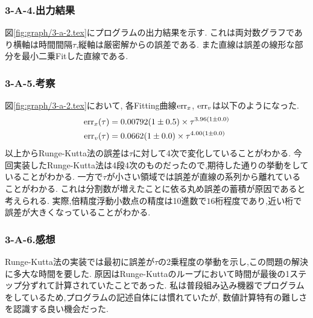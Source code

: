 \subsubsection*{3-A-4.出力結果}
図\ref{fig:graph/3-a-2.tex}にプログラムの出力結果を示す.
これは両対数グラフであり横軸は時間間隔$\tau$,縦軸は厳密解からの誤差である.
また直線は誤差の線形な部分を最小二乗Fitした直線である.
\subsubsection*{3-A-5.考察}
図\ref{fig:graph/3-a-2.tex}において,
各Fitting曲線${\rm err}_x$, ${\rm err}_v$は以下のようになった.
\begin{align}
  {\rm err}_x(\tau)&=0.00792(1\pm0.5)\times \tau^{3.96(1\pm0.0)}\\
  {\rm err}_v(\tau)&=0.0662(1\pm0.0)\times \tau^{4.00(1\pm0.0)}
\end{align}
以上からRunge-Kutta法の誤差は$\tau$に対して4次で変化していることがわかる.
今回実装したRunge-Kutta法は4段4次のものだったので,期待した通りの挙動をしていることがわかる.
一方で$\tau$が小さい領域では誤差が直線の系列から離れていることがわかる.
これは分割数が増えたことに依る丸め誤差の蓄積が原因であると考えられる.
実際,倍精度浮動小数点の精度は10進数で$16$桁程度であり,近い桁で誤差が大きくなっていることがわかる.
\subsubsection*{3-A-6.感想}
Runge-Kutta法の実装では最初に誤差が$\tau$の2乗程度の挙動を示し,この問題の解決に多大な時間を要した.
原因はRunge-Kuttaのループにおいて時間が最後の1ステップ分ずれて計算されていたことであった.
私は普段組み込み機器でプログラムをしているため,プログラムの記述自体には慣れていたが,
数値計算特有の難しさを認識する良い機会だった.